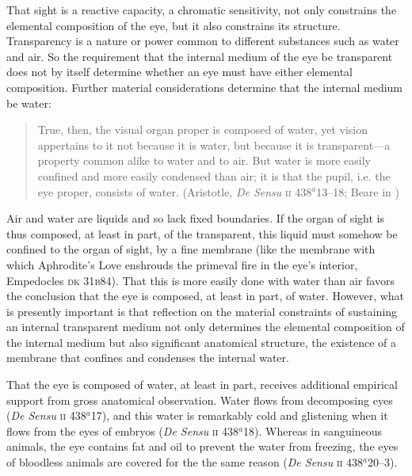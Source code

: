 That sight is a reactive capacity, a chromatic sensitivity, not only constrains the elemental composition of the eye, but it also constrains its structure. Transparency is a nature or power common to different substances such as water and air. So the requirement that the internal medium of the eye be transparent does not by itself determine whether an eye must have either elemental composition. Further material considerations determine that the internal medium be water:
\begin{quote}
	True, then, the visual organ proper is composed of water, yet vision appertains to it not because it is water, but because it is transparent---a property common alike to water and to air. But water is more easily confined and more easily condensed than air; it is that the pupil, i.e. the eye proper, consists of water. (Aristotle, \emph{De Sensu} \textsc{ii} 438\( ^{a} \)13--18; Beare in \citealt[5]{Barnes:1984uq})
\end{quote}
Air and water are liquids and so lack fixed boundaries. If the organ of sight is thus composed, at least in part, of the transparent, this liquid must somehow be confined to the organ of sight, by a fine membrane (like the membrane with which Aphrodite's Love enshrouds the primeval fire in the eye's interior, Empedocles \textsc{dk} 31\textsc{b}84). That this is more easily done with water than air favors the conclusion that the eye is composed, at least in part, of water. However, what is presently important is that reflection on the material constraints of sustaining an internal transparent medium not only determines the elemental composition of the internal medium but also significant anatomical structure, the existence of a membrane that confines and condenses the internal water.

That the eye is composed of water, at least in part, receives additional empirical support from gross anatomical observation. Water flows from decomposing eyes (\emph{De Sensu} \textsc{ii} 438\( ^{a} \)17), and this water is remarkably cold and glistening when it flows from the eyes of embryos (\emph{De Sensu} \textsc{ii} 438\( ^{a} \)18). Whereas in sanguineous animals, the eye contains fat and oil to prevent the water from freezing, the eyes of bloodless animals are covered for the the same reason (\emph{De Sensu} \textsc{ii} 438\( ^{a} \)20--3).


